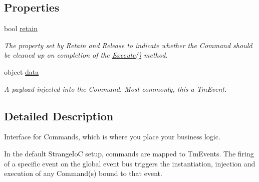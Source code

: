 \subsection*{Properties}
\begin{DoxyCompactItemize}
\item 
\hypertarget{interfacestrange_1_1extensions_1_1command_1_1api_1_1_i_command_ac69e1fd7542d521e9e04c24bc47791bb}{bool \hyperlink{interfacestrange_1_1extensions_1_1command_1_1api_1_1_i_command_ac69e1fd7542d521e9e04c24bc47791bb}{retain}}\label{interfacestrange_1_1extensions_1_1command_1_1api_1_1_i_command_ac69e1fd7542d521e9e04c24bc47791bb}

\begin{DoxyCompactList}\small\item\em The property set by {\ttfamily Retain} and {\ttfamily Release} to indicate whether the Command should be cleaned up on completion of the {\ttfamily \hyperlink{interfacestrange_1_1extensions_1_1command_1_1api_1_1_i_command_a49ddf3bbaf19624534fa99fa4725feca}{Execute()}} method. \end{DoxyCompactList}\item 
\hypertarget{interfacestrange_1_1extensions_1_1command_1_1api_1_1_i_command_afa2693fc9c9747093acde1dcab858570}{object \hyperlink{interfacestrange_1_1extensions_1_1command_1_1api_1_1_i_command_afa2693fc9c9747093acde1dcab858570}{data}}\label{interfacestrange_1_1extensions_1_1command_1_1api_1_1_i_command_afa2693fc9c9747093acde1dcab858570}

\begin{DoxyCompactList}\small\item\em A payload injected into the Command. Most commonly, this a Tm\-Event. \end{DoxyCompactList}\end{DoxyCompactItemize}


\subsection{Detailed Description}
Interface for Commands, which is where you place your business logic. 

In the default Strange\-Io\-C setup, commands are mapped to Tm\-Events. The firing of a specific event on the global event bus triggers the instantiation, injection and execution of any Command(s) bound to that event.

